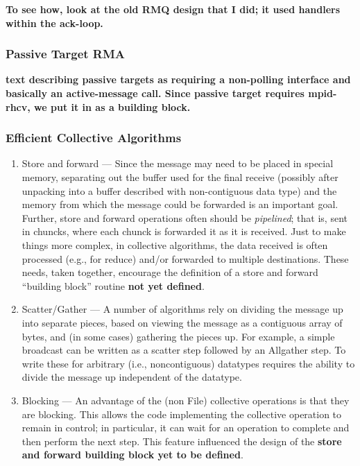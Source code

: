 \documentclass{article}
\begin{document}
\textbf{To see how, look at the old RMQ design that I did; it used
handlers within the ack-loop.} 

\subsubsection{Passive Target RMA}
\label{sec-passive-target}
\textbf{text describing passive targets as requiring a non-polling
interface and basically an active-message call.  Since passive target
requires mpid-rhcv, we put it in as a building block.}

\subsubsection{Efficient Collective Algorithms}
\begin{enumerate}
\item Store and forward --- Since the message may need to be placed in
special memory, separating out the buffer used for the final receive
(possibly after unpacking into a buffer described with non-contiguous
data type) and the memory from which the message could be forwarded is
an important goal.  Further, store and
forward operations often should be \emph{pipelined}; that is, sent in
chuncks, where each chunck is forwarded it as it is received.
Just to make things more complex, in collective algorithms, the data
received is often processed (e.g., for reduce) and/or forwarded to
multiple destinations.  These needs, taken together, encourage the
definition of a store and forward ``building block'' routine
\textbf{not yet defined}.

\item Scatter/Gather --- A number of algorithms rely on dividing the
message up into separate pieces, based on viewing the message as a
contiguous array of bytes, and (in some cases) gathering the pieces
up.  For example, a simple broadcast can be written as a scatter step
followed by an Allgather step.  To write these for arbitrary (i.e.,
noncontiguous) datatypes requires the ability to divide the message up
independent of the datatype.  

\item Blocking --- An advantage of the (non File) collective
operations is that they are blocking.  This allows the code
implementing the collective operation to remain in control; in
particular, it can wait for an operation to complete and then perform
the next step.  This feature influenced the design of the
\textbf{store and forward building block yet to be defined}.
\end{enumerate}
\end{document}
